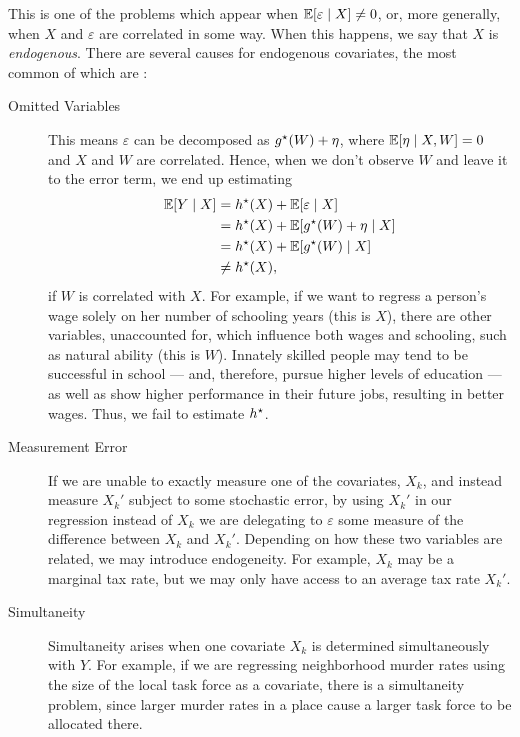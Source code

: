 This is one of the problems which appear when $ \mathbb{E} [ \varepsilon \mid X ] \neq 0 $, or, more generally, when $ X $ and $ \varepsilon $ are correlated in some way.
When this happens, we say that $ X $ is \emph{endogenous}.
There are several causes for endogenous covariates, the most common of  which are \cite{wooldridge2001}:
\begin{description}
    \item[Omitted Variables] This means $ \varepsilon $ can be decomposed as $ g^{ \star } ( W ) + \eta $, where $ \mathbb{E} [ \eta \mid X, W ] = 0 $ and $ X $ and $ W $ are correlated.
        Hence, when we don't observe $ W $ and leave it to the error term, we end up estimating
        \begin{align*}
            \mathbb{E} [ Y \mid X ]
            &= h^{ \star } ( X ) + \mathbb{E} [ \varepsilon \mid X ] \\
            &= h^{ \star } ( X ) + \mathbb{E} [ g^{ \star } ( W ) + \eta \mid X ] \\
            &= h^{ \star } ( X ) + \mathbb{E} [ g^{ \star } ( W ) \mid X ] \\
            &\neq h^{ \star } ( X )
        ,\end{align*}
        if $ W $ is correlated with $ X $.
        For example, if we want to regress a person's wage solely on her number of schooling years (this is $ X $), there are other variables, unaccounted for, which influence both wages and schooling, such as natural ability (this is $ W $).
        Innately skilled people may tend to be successful in school --- and, therefore, pursue higher levels of education --- as well as show higher performance in their future jobs, resulting in better wages.
        Thus, we fail to estimate $ h^{ \star } $.
    \item[Measurement Error] If we are unable to exactly measure one of the covariates, $ X_{ k } $, and instead measure $ X_{ k }' $ subject to some stochastic error, by using $ X_{ k }' $ in our regression instead of $ X_{ k } $ we are delegating to $ \varepsilon $ some measure of the difference between $ X_{ k } $ and $ X_{ k }' $.
        Depending on how these two variables are related, we may introduce endogeneity.
        For example, $ X_{ k } $ may be a marginal tax rate, but we may only have access to an average tax rate $ X_{ k }' $.
    \item[Simultaneity] Simultaneity arises when one covariate $ X_{ k } $ is determined simultaneously with $ Y $.
        For example, if we are regressing neighborhood murder rates using the size of the local task force as a covariate, there is a simultaneity problem, since larger murder rates in a place cause a larger task force to be allocated there.
\end{description}

